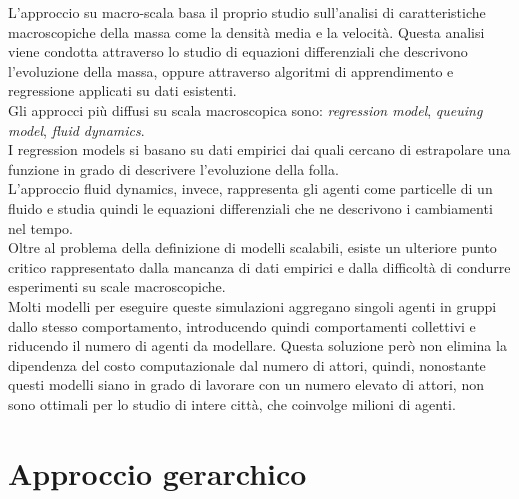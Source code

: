 L'approccio su macro-scala basa il proprio studio sull'analisi di caratteristiche macroscopiche della massa come la densità media e la velocità. Questa analisi viene condotta attraverso lo studio di equazioni differenziali che descrivono l'evoluzione della massa, oppure attraverso algoritmi di apprendimento e regressione applicati su dati esistenti. \\
Gli approcci più diffusi su scala macroscopica sono: \textit{regression model}, \textit{queuing model}, \textit{fluid dynamics}.\\
I regression models si basano su dati empirici dai quali cercano di estrapolare una funzione in grado di descrivere l'evoluzione della folla.\\
L'approccio fluid dynamics, invece, rappresenta gli agenti come particelle di un fluido e studia quindi le equazioni differenziali che ne descrivono i cambiamenti nel tempo.\\
Oltre al problema della definizione di modelli scalabili, esiste un ulteriore punto critico rappresentato dalla mancanza di dati empirici e dalla difficoltà di condurre esperimenti su scale macroscopiche.\\
Molti modelli per eseguire queste simulazioni aggregano singoli agenti in gruppi dallo stesso comportamento, introducendo quindi comportamenti collettivi e riducendo il numero di agenti da modellare. Questa soluzione però non elimina la dipendenza del costo computazionale dal numero di attori, quindi, nonostante questi modelli siano in grado di lavorare con un numero elevato di attori, non sono ottimali per lo studio di intere città, che coinvolge milioni di agenti.

\section{Approccio gerarchico}
\label{sec:approccio-gerarchico}


